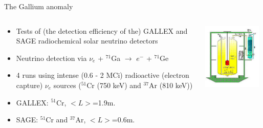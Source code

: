 \begin{frame}[t]{The Gallium anomaly}

\begin{columns}
  \begin{column}{0.60\textwidth}
  \begin{itemize}
   \item Tests of (the detection efficiency of the) GALLEX and SAGE radiochemical solar neutrino detectors
   \item Neutrino detection via $\nu_{e}$ + $^{71}$Ga $\rightarrow$ $e^{-}$ + $^{71}$Ge
   \item 4 runs using intense (0.6 - 2 MCi) radioactive (electron capture) $\nu_{e}$ sources
         ($^{51}$Cr (750 keV) and $^{37}$Ar (810 keV))
   \item GALLEX: $^{51}$Cr, $<L>$=1.9m.
   \item SAGE: $^{51}$Cr and $^{37}$Ar, $<L>$=0.6m.
  \end{itemize}
  \end{column}
  \begin{column}{0.40\textwidth}
    \includegraphics[width=0.95\textwidth]{./images/beyond3nu/gallium/gallex.jpg}
  \end{column}
\end{columns}
\end{frame}

